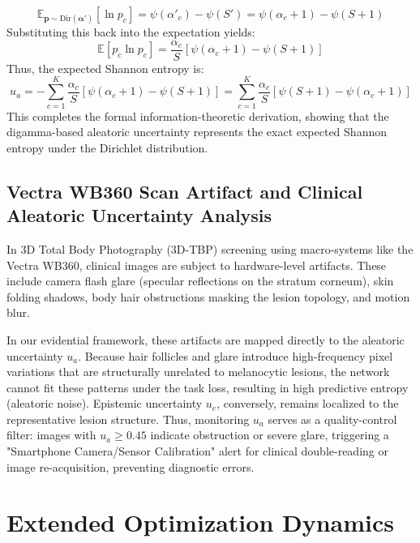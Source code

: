 \documentclass[letterpaper]{article} %
\begin{document}
\begin{equation}
    \mathbb{E}_{\bm{p} \sim \text{Dir}(\bm{\alpha}')}[\ln p_c] = \psi(\alpha'_c) - \psi(S') = \psi(\alpha_c + 1) - \psi(S + 1)
\end{equation}
Substituting this back into the expectation yields:
\begin{equation}
    \mathbb{E}[p_c \ln p_c] = \frac{\alpha_c}{S} \left[ \psi(\alpha_c + 1) - \psi(S + 1) \right]
\end{equation}
Thus, the expected Shannon entropy is:
\begin{equation}
    u_a = -\sum_{c=1}^K \frac{\alpha_c}{S} \left[ \psi(\alpha_c + 1) - \psi(S + 1) \right] = \sum_{c=1}^K \frac{\alpha_c}{S} \left[ \psi(S + 1) - \psi(\alpha_c + 1) \right]
\end{equation}
This completes the formal information-theoretic derivation, showing that the digamma-based aleatoric uncertainty represents the exact expected Shannon entropy under the Dirichlet distribution.

\subsection{Vectra WB360 Scan Artifact and Clinical Aleatoric Uncertainty Analysis}
In 3D Total Body Photography (3D-TBP) screening using macro-systems like the Vectra WB360, clinical images are subject to hardware-level artifacts. These include camera flash glare (specular reflections on the stratum corneum), skin folding shadows, body hair obstructions masking the lesion topology, and motion blur. 

In our evidential framework, these artifacts are mapped directly to the aleatoric uncertainty $u_a$. Because hair follicles and glare introduce high-frequency pixel variations that are structurally unrelated to melanocytic lesions, the network cannot fit these patterns under the task loss, resulting in high predictive entropy (aleatoric noise). Epistemic uncertainty $u_e$, conversely, remains localized to the representative lesion structure. Thus, monitoring $u_a$ serves as a quality-control filter: images with $u_a \ge 0.45$ indicate obstruction or severe glare, triggering a "Smartphone Camera/Sensor Calibration" alert for clinical double-reading or image re-acquisition, preventing diagnostic errors.

\section{Extended Optimization Dynamics}
\end{document}
